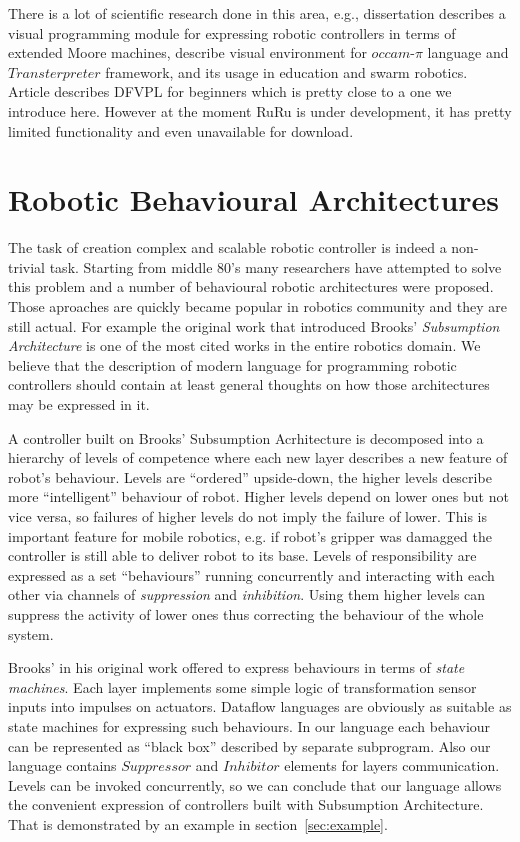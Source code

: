 \documentclass[conference,compsoc]{IEEEtran}
\begin{document}
There is a lot of scientific research done in this area, e.g., dissertation\cite{banyasad2000visual} describes a visual programming module for expressing robotic controllers in terms of extended Moore machines, \cite{simpson2008visual, posso2011process} describe visual environment for $occam\mbox{-}\pi$ language and $Transterpreter$ framework, and its usage in education and swarm robotics. Article\cite{diprose2011ruru} describes DFVPL for beginners which is pretty close to a one we introduce here. However at the moment RuRu is under development, it has pretty limited functionality and even unavailable for download.

\section{Robotic Behavioural Architectures}
\label{sec:Architectures}

The task of creation complex and scalable robotic controller is indeed a non-trivial task. Starting from middle 80's many researchers have attempted to solve this problem and a number of behavioural robotic architectures were proposed\cite{simpson2009toward}. Those aproaches are quickly became popular in robotics community and they are still actual. For example the original work that introduced Brooks' \textit{Subsumption Architecture}\cite{brooks1986robust} is one of the most cited works in the entire robotics domain. We believe that the description of modern language for programming robotic controllers should contain at least general thoughts on how those architectures may be expressed in it.

A controller built on Brooks' Subsumption Acrhitecture is decomposed into a hierarchy of levels of competence where each new layer describes a new feature of robot's behaviour. Levels are ``ordered'' upside-down, the higher levels describe more ``intelligent''  behaviour of robot. Higher levels depend on lower ones but not vice versa, so failures of higher levels do not imply the failure of lower. This is important feature for mobile robotics, e.g. if robot's gripper was damagged the controller is still able to deliver robot to its base. Levels of responsibility are expressed as a set ``behaviours'' running concurrently and interacting with each other via channels of \textit{suppression} and \textit{inhibition}. Using them higher levels can suppress the activity of lower ones thus correcting the behaviour of the whole system.

Brooks' in his original work offered to express behaviours in terms of \textit{state machines}. Each layer implements some simple logic of transformation sensor inputs into impulses on actuators. Dataflow languages are obviously as suitable as state machines for expressing such behaviours. In our language each behaviour can be represented as ``black box'' described by separate subprogram. Also our language contains $Suppressor$ and $Inhibitor$ elements for layers communication. Levels can be invoked concurrently, so we can conclude that our language allows the convenient expression of controllers built with Subsumption Architecture. That is demonstrated by an example in section~\ref{sec:example}.
\end{document}
